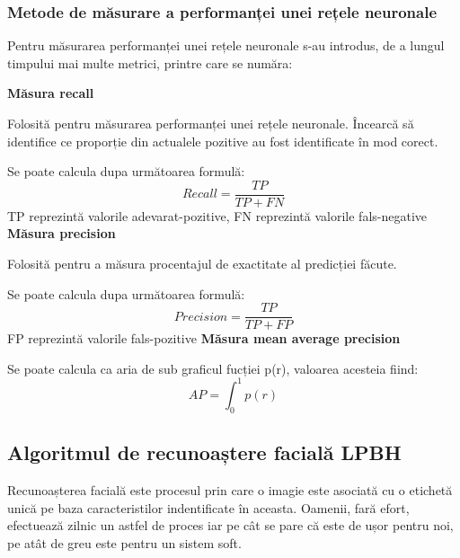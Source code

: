 \documentclass[a4paper, 12pt]{article}
\begin{document}
	\subsubsection{Metode de măsurare a performanței unei rețele neuronale}
	\bigskip
	\quad Pentru măsurarea performanței unei rețele neuronale s-au introdus, de a lungul timpului mai multe metrici, printre care se număra:
	\bigskip
	\begin{outline}
		\1 \textbf{Măsura recall} \textbf{\cite{hui_hui_2018}}
		
		\quad Folosită pentru măsurarea performanței unei rețele neuronale. Încearcă să identifice ce proporție din actualele pozitive au fost identificate în mod corect.
		
		\quad Se poate calcula dupa următoarea formulă:
		\begin{equation}
			Recall = \frac{TP}{TP + FN}
		\end{equation}
		\quad TP reprezintă valorile adevarat-pozitive, FN reprezintă valorile fals-negative
		\bigskip
		\1 \textbf{Măsura precision} \textbf{\cite{hui_hui_2018}}
		
		\bigskip
		\quad Folosită pentru a măsura procentajul de exactitate al predicției făcute.
		
		\quad Se poate calcula dupa următoarea formulă:
		\begin{equation}
			Precision = \frac{TP}{TP + FP}
		\end{equation}
		\quad FP reprezintă valorile fals-pozitive
		\bigskip
		\1 \textbf{Măsura mean average precision} \textbf{\cite{hui_hui_2018}}\par
		\bigskip
		\quad Se poate calcula ca aria de sub graficul fucției p(r), valoarea acesteia fiind:
		\begin{equation}
			AP = \int_{0}^{1} p(r)
		\end{equation}
	\end{outline}
	
	\bigskip
	\subsection{Algoritmul de recunoaștere facială LPBH}
	
	\bigskip
	\quad Recunoașterea facială este procesul prin care o imagie este asociată cu o etichetă unică pe baza caracteristilor indentificate în aceasta. Oamenii, fară efort, efectuează zilnic un astfel de proces iar pe cât se pare că este de ușor pentru noi, pe atât de greu este pentru un sistem soft.
	
\end{document}
